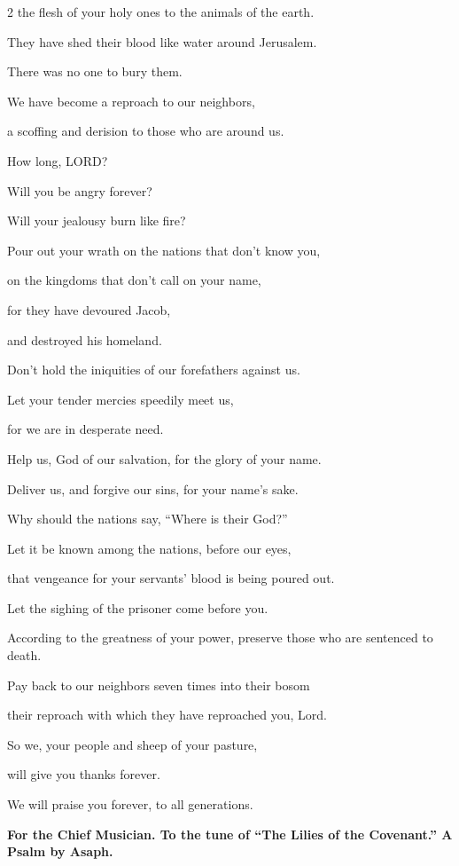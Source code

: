 \begin{multicols}{2}
	the flesh of your holy ones to the animals of the earth.
	
	
	\myverse{}They have shed their blood like water around Jerusalem.
	
	There was no one to bury them.
	
	
	\myverse{}We have become a reproach to our neighbors,
	
	a scoffing and derision to those who are around us.
	
	
	\myverse{}How long, LORD?
	
	Will you be angry forever?
	
	Will your jealousy burn like fire?
	
	
	\myverse{}Pour out your wrath on the nations that don’t know you,
	
	on the kingdoms that don’t call on your name,
	
	
	\myverse{}for they have devoured Jacob,
	
	and destroyed his homeland.
	
	
	\myverse{}Don’t hold the iniquities of our forefathers against us.
	
	Let your tender mercies speedily meet us,
	
	for we are in desperate need.
	
	
	\myverse{}Help us, God of our salvation, for the glory of your name.
	
	Deliver us, and forgive our sins, for your name’s sake.
	
	
	\myverse{}Why should the nations say, “Where is their God?”
	
	Let it be known among the nations, before our eyes,
	
	that vengeance for your servants’ blood is being poured out.
	
	
	\myverse{}Let the sighing of the prisoner come before you.
	
	According to the greatness of your power, preserve those who are sentenced to
	death.
	
	
	\myverse{}Pay back to our neighbors seven times into their bosom
	
	their reproach with which they have reproached you, Lord.
	
	
	\myverse{}So we, your people and sheep of your pasture,
	
	will give you thanks forever.
	
	We will praise you forever, to all generations.
	
	
	
	\mychapter{}\textbf{For the Chief Musician. To the tune of “The Lilies of the Covenant.” A Psalm by Asaph.}
	

\end{multicols}
